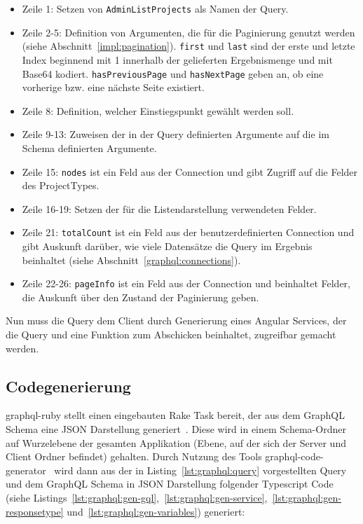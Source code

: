\begin{itemize}
	\setlength\itemsep{-1em}
	\item Zeile 1: Setzen von \texttt{AdminListProjects} als Namen der Query.
	\item Zeile 2-5: Definition von Argumenten, die für die Paginierung genutzt werden (siehe Abschnitt~\ref{impl:pagination}). \texttt{first} und \texttt{last} sind der erste und letzte Index beginnend mit 1 innerhalb der gelieferten Ergebnismenge und mit Base64 kodiert. \texttt{hasPreviousPage} und \texttt{hasNextPage} geben an, ob eine vorherige bzw. eine nächste Seite existiert.
	\item Zeile 8: Definition, welcher Einstiegspunkt gewählt werden soll.
	\item Zeile 9-13: Zuweisen der in der Query definierten Argumente auf die im Schema definierten Argumente.
	\item Zeile 15: \texttt{nodes} ist ein Feld aus der Connection und gibt Zugriff auf die Felder des ProjectTypes.
	\item Zeile 16-19: Setzen der für die Listendarstellung verwendeten Felder.
	\item Zeile 21: \texttt{totalCount} ist ein Feld aus der benutzerdefinierten Connection und gibt Auskunft darüber, wie viele Datensätze die Query im Ergebnis beinhaltet (siehe Abschnitt~\ref{graphql:connections}).
	\item Zeile 22-26: \texttt{pageInfo} ist ein Feld aus der Connection und beinhaltet Felder, die Auskunft über den Zustand der Paginierung geben.
\end{itemize}

Nun muss die Query dem Client durch Generierung eines Angular Services, der die Query und eine Funktion zum Abschicken beinhaltet, zugreifbar gemacht werden.

\subsection{Codegenerierung}
\label{impl:graphql:generation}
graphql-ruby stellt einen eingebauten Rake Task bereit, der aus dem GraphQL Schema eine JSON Darstellung generiert~\cite{graphql-rake-task}. Diese wird in einem Schema-Ordner auf Wurzelebene der gesamten Applikation (Ebene, auf der sich der Server und Client Ordner befindet) gehalten.
Durch Nutzung des Tools graphql-code-generator~\cite{graphql-code-generator} wird dann aus der in Listing~\ref{lst:graphql:query} vorgestellten Query und dem GraphQL Schema in JSON Darstellung folgender Typescript Code (siehe Listings~\ref{lst:graphql:gen-gql},~\ref{lst:graphql:gen-service},~\ref{lst:graphql:gen-responsetype} und~\ref{lst:graphql:gen-variables}) generiert:

